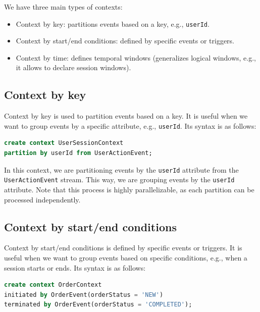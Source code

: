 We have three main types of contexts:

\begin{itemize}
    \item Context by key: partitions events based on a key, e.g., \texttt{userId}.

    \item Context by start/end conditions: defined by specific events or triggers.

    \item Context by time: defines temporal windows (generalizes logical windows, e.g., it allows
    to declare session windows).
\end{itemize}

\subsection{Context by key}

Context by key is used to partition events based on a key. It is useful when we want to group
events by a specific attribute, e.g., \texttt{userId}. Its syntax is as follows:\\

\begin{lstlisting}[language=SQL]
create context UserSessionContext
partition by userId from UserActionEvent;
\end{lstlisting}

In this context, we are partitioning events by the \texttt{userId} attribute from the
\texttt{UserActionEvent} stream. This way, we are grouping events by the \texttt{userId}
attribute. Note that this process is highly parallelizable, as each partition can be processed
independently.

\subsection{Context by start/end conditions}

Context by start/end conditions is defined by specific events or triggers. It is useful when we
want to group events based on specific conditions, e.g., when a session starts or ends. Its syntax
is as follows:\\

\begin{lstlisting}[language=SQL]
create context OrderContext
initiated by OrderEvent(orderStatus = 'NEW')
terminated by OrderEvent(orderStatus = 'COMPLETED');
\end{lstlisting}

